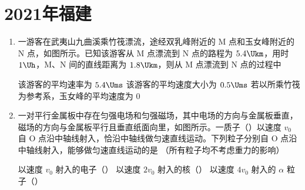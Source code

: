 \documentclass[\gkver]{gaokaozhenti}
\begin{document}
\chapter{2021年福建}

\begin{enumerate}
\item
一游客在武夷山九曲溪乘竹筏漂流，途经双乳峰附近的 M 点和玉女峰附近的 N 点，如图所示。已知该游客从 M 点漂流到 N 点的路程为 $5.4 \Ukm$，用时 $1 \Uh$，M、N 间的直线距离为 $1.8 \Ukm$，则从 M 点漂流到 N 点的过程中 


{该游客的平均速率为 $5.4 \Ums$}
{该游客的平均速度大小为 $0.5 \Ums$}
{若以所乘竹筏为参考系，玉女峰的平均速度为 0}


\item
一对平行金属板中存在匀强电场和匀强磁场，其中电场的方向与金属板垂直，磁场的方向与金属板平行且垂直纸面向里，如图所示。一质子（）以速度 $v_{0}$ 自 O 点沿中轴线射入，恰沿中轴线做匀速直线运动。下列粒子分别自 O 点沿中轴线射入，能够做匀速直线运动的是 （所有粒子均不考虑重力的影响）


{以速度 $v_{0}$ 射入的电子（）}
{以速度 $2v_{0}$ 射入的核（）}
{以速度 $4v_{0}$ 射入的 $\alpha$ 粒子（）}


\end{enumerate}
\end{document}
